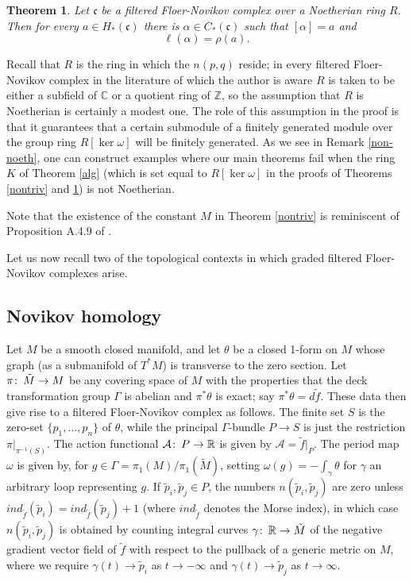 \documentclass{amsart}
\theoremstyle{plain}
\newtheorem{theorem}{Theorem}[section]
\theoremstyle{definition}
\theoremstyle{remark}
\def\co{\colon\thinspace}
\begin{document}
\begin{theorem}  \label{tight} Let $\mathfrak{c}$ be a  filtered Floer-Novikov complex over a Noetherian ring $R$.   Then for every $a\in H_*(\mathfrak{c})$ there is $\alpha\in C_*(\mathfrak{c})$ such that $[\alpha]=a$ and \[ \ell(\alpha)=\rho(a).\] \end{theorem}

Recall that $R$ is the ring in which the $n(p,q)$ reside; in every filtered Floer-Novikov complex in the literature of which the author is aware $R$ is taken to be either a subfield of $\mathbb{C}$ or a quotient ring of $\mathbb{Z}$, so the assumption that $R$ is Noetherian is certainly a modest one.   The role of this assumption in the proof is that it guarantees that a certain submodule of a finitely generated module over the group ring $R[\ker\omega]$ will be finitely generated.  As we see in Remark \ref{non-noeth}, one can construct examples where our main theorems fail when the ring $K$ of Theorem \ref{alg} (which is set equal to $R[\ker \omega]$ in the proofs of Theorems \ref{nontriv} and \ref{tight}) is not Noetherian.

Note that the existence of the constant $M$ in Theorem \ref{nontriv} is reminiscent of Proposition A.4.9 of \cite{FOOO}.

Let us now recall two of the topological contexts in which graded filtered Floer-Novikov complexes arise.

\subsection{Novikov homology}  Let $M$ be a smooth closed manifold, and let $\theta$ be a closed 1-form on $M$ whose graph (as a submanifold of $T^*M$) is transverse to the zero section.  Let $\pi\co \tilde{M}\to M$ be any covering space of $M$ with the properties that the deck transformation group $\Gamma$ is abelian and $\pi^*\theta$ is exact; say $\pi^*\theta=d\tilde{f}$.  These data then give rise to a filtered Floer-Novikov complex as follows.  The finite set $S$ is the zero-set $\{p_1,\ldots,p_n\}$ of $\theta$, while the principal $\Gamma$-bundle $P\to S$ is just the restriction $\pi|_{\pi^{-1}(S)}$.  The action functional $\mathcal{A}\co P\to\mathbb{R}$ is given by $\mathcal{A}=\tilde{f}|_{P}$.  The period map $\omega$ is given by, for $g\in \Gamma=\pi_1(M)/\pi_1(\tilde{M})$, setting $\omega(g)=-\int_{\gamma}\theta$ for $\gamma$ an arbitrary loop representing $g$.   If  $\tilde{p}_i,\tilde{p}_j\in P$, the numbers $n(\tilde{p}_i,\tilde{p}_j)$ are zero unless $ind_{\tilde{f}}(\tilde{p}_i)=ind_{\tilde{f}}(\tilde{p}_j)+1$ (where $ind_{\tilde{f}}$ denotes the Morse index), in which case $n(\tilde{p}_i,\tilde{p}_j)$ is  obtained by counting integral curves $\gamma\co \mathbb{R}\to \tilde{M}$ of the negative gradient vector field of $\tilde{f}$ with respect to the pullback of a generic metric on $M$, where we require $\gamma(t)\to\tilde{p}_i$ as $t\to -\infty$ and $\gamma(t)\to \tilde{p}_j$ as $t\to\infty$.
\end{document}

